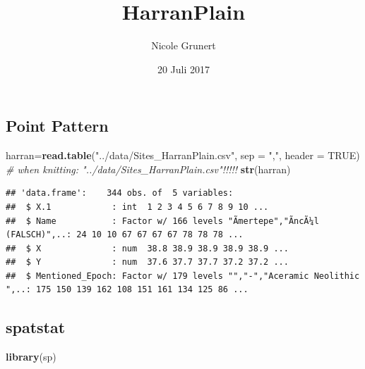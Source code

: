 \documentclass[]{article}
\title{HarranPlain}
\author{Nicole Grunert}
\date{20 Juli 2017}
\newenvironment{Shaded}{\begin{snugshade}}{\end{snugshade}}
\newcommand{\KeywordTok}[1]{\textcolor[rgb]{0.13,0.29,0.53}{\textbf{{#1}}}}
\newcommand{\DataTypeTok}[1]{\textcolor[rgb]{0.13,0.29,0.53}{{#1}}}
\newcommand{\StringTok}[1]{\textcolor[rgb]{0.31,0.60,0.02}{{#1}}}
\newcommand{\CommentTok}[1]{\textcolor[rgb]{0.56,0.35,0.01}{\textit{{#1}}}}
\newcommand{\OtherTok}[1]{\textcolor[rgb]{0.56,0.35,0.01}{{#1}}}
\newcommand{\NormalTok}[1]{{#1}}
\begin{document}
\maketitle

{
\setcounter{tocdepth}{2}
\tableofcontents
}
\begin{Shaded}
\end{Shaded}

\subsection{Point Pattern}\label{point-pattern}

\begin{Shaded}
\begin{Highlighting}[]
\NormalTok{harran=}\KeywordTok{read.table}\NormalTok{(}\StringTok{"../data/Sites_HarranPlain.csv"}\NormalTok{,}
                  \DataTypeTok{sep =} \StringTok{","}\NormalTok{,}
                  \DataTypeTok{header =} \OtherTok{TRUE}\NormalTok{)   }\CommentTok{# when knitting: "../data/Sites_HarranPlain.csv"!!!!!}
\KeywordTok{str}\NormalTok{(harran)}
\end{Highlighting}
\end{Shaded}

\begin{verbatim}
## 'data.frame':    344 obs. of  5 variables:
##  $ X.1            : int  1 2 3 4 5 6 7 8 9 10 ...
##  $ Name           : Factor w/ 166 levels "Ãmertepe","ÃncÃ¼l (FALSCH)",..: 24 10 10 67 67 67 67 78 78 78 ...
##  $ X              : num  38.8 38.9 38.9 38.9 38.9 ...
##  $ Y              : num  37.6 37.7 37.7 37.2 37.2 ...
##  $ Mentioned_Epoch: Factor w/ 179 levels "","-","Aceramic Neolithic ",..: 175 150 139 162 108 151 161 134 125 86 ...
\end{verbatim}

\subsection{spatstat}\label{spatstat}

\begin{Shaded}
\begin{Highlighting}[]
\KeywordTok{library}\NormalTok{(sp)}
\end{Highlighting}
\end{Shaded}
\end{document}
